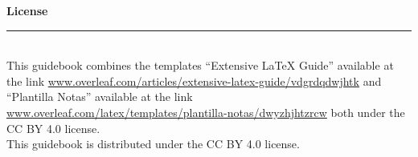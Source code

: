 \tableofcontents
\vfill
\footnotesize{\noindent \textbf{License} \vspace{-3mm}\\
	\noindent \rule{3.2cm}{0.5pt} \\
	{This guidebook combines the templates ``Extensive LaTeX Guide'' available at the link \url{www.overleaf.com/articles/extensive-latex-guide/vdgrdqdwjhtk} and ``Plantilla Notas'' available at the link \url{www.overleaf.com/latex/templates/plantilla-notas/dwyzhjhtzrcw} both under the CC BY 4.0 license.\\
	This guidebook is distributed under the CC BY 4.0 license. 
	}}
\newpage
{}
